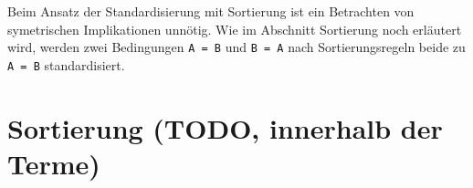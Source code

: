 Beim Ansatz der Standardisierung mit Sortierung ist ein Betrachten von symetrischen Implikationen unnötig. Wie im Abschnitt Sortierung noch erläutert wird, werden zwei Bedingungen \verb|A = B| und \verb|B = A| nach Sortierungsregeln beide zu \verb|A = B| standardisiert. 

\section{Sortierung (TODO, innerhalb der Terme)}

